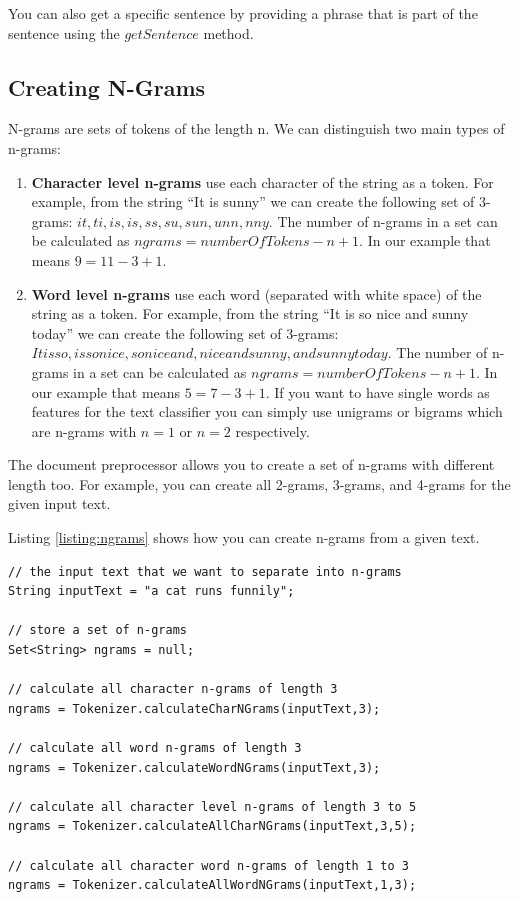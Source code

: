 \documentclass[a4paper,twoside]{book}      %
\begin{document}
You can also get a specific sentence by providing a phrase that is part of the sentence using the $getSentence$ method.

\subsection{Creating N-Grams}
\label{sec:ngrams}

N-grams are sets of tokens of the length n. We can distinguish two main types of n-grams:

\begin{enumerate}
\item \textbf{Character level n-grams} use each character of the string as a token. For example, from the string ``It is sunny'' we can create the following set of 3-grams: ${it ,t i, is,is ,s s, su,sun,unn,nny}$. The number of n-grams in a set can be calculated as $ngrams = numberOfTokens - n + 1$. In our example that means $9 = 11 - 3 + 1$.
\item \textbf{Word level n-grams} use each word (separated with white space) of the string as a token. For example, from the string ``It is so nice and sunny today'' we can create the following set of 3-grams: ${It is so,is so nice,so nice and,nice and sunny,and sunny today}$. The number of n-grams in a set can be calculated as $ngrams = numberOfTokens - n + 1$. In our example that means $5 = 7 - 3 + 1$. If you want to have single words as features for the text classifier you can simply use unigrams or bigrams which are n-grams with $n=1$ or $n=2$ respectively.
\end{enumerate}

The document preprocessor allows you to create a set of n-grams with different length too. For example, you can create all 2-grams, 3-grams, and 4-grams for the given input text.

Listing \ref{listing:ngrams} shows how you can create n-grams from a given text.

\begin{codelisting}
\begin{lstlisting}[label=listing:ngrams,caption=Creating n-grams.,frame=tb]
// the input text that we want to separate into n-grams
String inputText = "a cat runs funnily";

// store a set of n-grams
Set<String> ngrams = null;

// calculate all character n-grams of length 3
ngrams = Tokenizer.calculateCharNGrams(inputText,3);

// calculate all word n-grams of length 3
ngrams = Tokenizer.calculateWordNGrams(inputText,3);

// calculate all character level n-grams of length 3 to 5
ngrams = Tokenizer.calculateAllCharNGrams(inputText,3,5);

// calculate all character word n-grams of length 1 to 3
ngrams = Tokenizer.calculateAllWordNGrams(inputText,1,3);
\end{lstlisting}
\end{codelisting}
\end{document}
